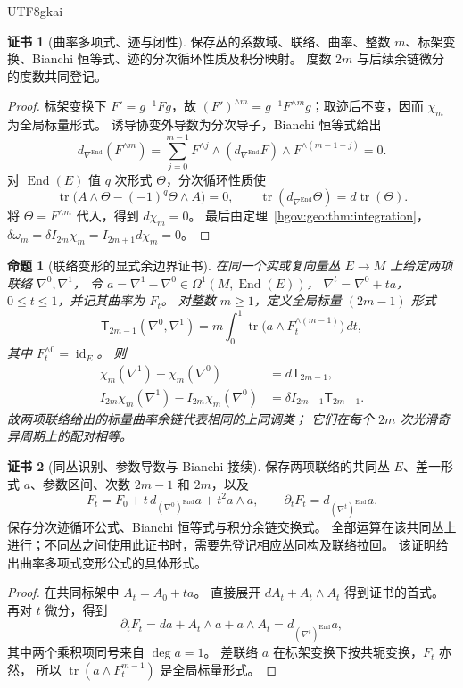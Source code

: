 \documentclass[12pt,a4paper,openany,notitlepage]{report}
\theoremstyle{plain}
\newtheorem{proposition}[theorem]{命题}
\theoremstyle{definition}
\newtheorem*{certificate}{证书}
\theoremstyle{remark}
\begin{document}
\begin{CJK*}{UTF8}{gkai}
\begin{certificate}[曲率多项式、迹与闭性]
保存丛的系数域、联络、曲率、整数 $m$、标架变换、Bianchi 恒等式、迹的分次循环性质及积分映射。
度数 $2m$ 与后续余链微分的度数共同登记。
\end{certificate}

\begin{proof}
标架变换下 $F'=g^{-1}Fg$，故
$(F')^{\wedge m}=g^{-1}F^{\wedge m}g$；取迹后不变，因而 $\chi_m$ 为全局标量形式。
诱导协变外导数为分次导子，Bianchi 恒等式给出
\[
d_{\nabla^{\operatorname{End}}}(F^{\wedge m})
=\sum_{j=0}^{m-1}
F^{\wedge j}\wedge
(d_{\nabla^{\operatorname{End}}}F)
\wedge F^{\wedge(m-1-j)}=0.
\]
对 $\operatorname{End}(E)$ 值 $q$ 次形式 $\Theta$，分次循环性质使
\[
\operatorname{tr}\bigl(A\wedge\Theta-(-1)^q\Theta\wedge A\bigr)=0,
\qquad
\operatorname{tr}(d_{\nabla^{\operatorname{End}}}\Theta)
=d\operatorname{tr}(\Theta).
\]
将 $\Theta=F^{\wedge m}$ 代入，得到 $d\chi_m=0$。
最后由定理~\ref{hgov:geo:thm:integration}，
$\delta\omega_m=\delta I_{2m}\chi_m=I_{2m+1}d\chi_m=0$。
\end{proof}

\begin{proposition}[联络变形的显式余边界证书]
\label{exp:geo:prop:transgression}
在同一个实或复向量丛 $E\to M$ 上给定两项联络 $\nabla^0,\nabla^1$，
令 $a=\nabla^1-\nabla^0\in\Omega^1(M,\operatorname{End}(E))$，
$\nabla^t=\nabla^0+t a$，$0\le t\le1$，并记其曲率为 $F_t$。
对整数 $m\ge1$，定义全局标量 $(2m-1)$ 形式
\[
\mathsf T_{2m-1}(\nabla^0,\nabla^1)
=m\int_0^1\operatorname{tr}\bigl(a\wedge F_t^{\wedge(m-1)}\bigr)\,dt,
\]
其中 $F_t^{\wedge0}=\operatorname{id}_E$。
则
\begin{align}
\label{exp:geo:eq:transgression-form}
\chi_m(\nabla^1)-\chi_m(\nabla^0)&=d\mathsf T_{2m-1},\\
\label{exp:geo:eq:transgression-cochain}
I_{2m}\chi_m(\nabla^1)-I_{2m}\chi_m(\nabla^0)
&=\delta I_{2m-1}\mathsf T_{2m-1}.
\end{align}
故两项联络给出的标量曲率余链代表相同的上同调类；
它们在每个 $2m$ 次光滑奇异周期上的配对相等。
\end{proposition}
\begin{certificate}[同丛识别、参数导数与 Bianchi 接续]
保存两项联络的共同丛 $E$、差一形式 $a$、参数区间、次数 $2m-1$ 和 $2m$，以及
\[
F_t=F_0+t\,d_{(\nabla^0)^{\operatorname{End}}}a+t^2a\wedge a,
\qquad
\partial_tF_t=d_{(\nabla^t)^{\operatorname{End}}}a.
\]
保存分次迹循环公式、Bianchi 恒等式与积分余链交换式。
全部运算在该共同丛上进行；不同丛之间使用此证书时，需要先登记相应丛同构及联络拉回。
该证明给出曲率多项式变形公式的具体形式\cite{ExtBottTu,ExtKobayashiNomizu}。
\end{certificate}
\begin{proof}
在共同标架中 $A_t=A_0+t a$。
直接展开 $dA_t+A_t\wedge A_t$ 得到证书的首式。
再对 $t$ 微分，得到
\[
\partial_tF_t
=da+A_t\wedge a+a\wedge A_t
=d_{(\nabla^t)^{\operatorname{End}}}a,
\]
其中两个乘积项同号来自 $\deg a=1$。
差联络 $a$ 在标架变换下按共轭变换，$F_t$ 亦然，
所以 $\operatorname{tr}(a\wedge F_t^{m-1})$ 是全局标量形式。


\end{proof}
\end{CJK*}
\end{document}

